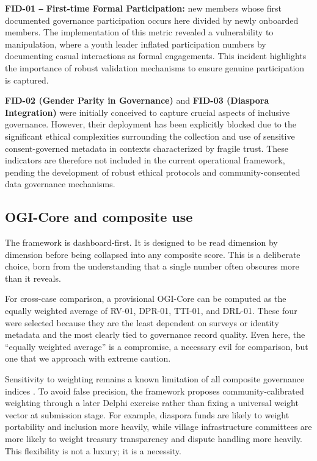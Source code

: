 \documentclass[sigconf,anonymous]{acmart}
\begin{document}
\textbf{FID-01 ‒ First-time Formal Participation:} new members whose first documented governance participation occurs here divided by newly onboarded members. The implementation of this metric revealed a vulnerability to manipulation, where a youth leader inflated participation numbers by documenting casual interactions as formal engagements. This incident highlights the importance of robust validation mechanisms to ensure genuine participation is captured.

\textbf{FID-02 (Gender Parity in Governance)} and \textbf{FID-03 (Diaspora Integration)} were initially conceived to capture crucial aspects of inclusive governance. However, their deployment has been explicitly blocked due to the significant ethical complexities surrounding the collection and use of sensitive consent-governed metadata in contexts characterized by fragile trust. These indicators are therefore not included in the current operational framework, pending the development of robust ethical protocols and community-consented data governance mechanisms.

\subsection{OGI-Core and composite use}

The framework is dashboard-first. It is designed to be read dimension by dimension before being collapsed into any composite score. This is a deliberate choice, born from the understanding that a single number often obscures more than it reveals.

For cross-case comparison, a provisional OGI-Core can be computed as the equally weighted average of RV-01, DPR-01, TTI-01, and DRL-01. These four were selected because they are the least dependent on surveys or identity metadata and the most clearly tied to governance record quality. Even here, the “equally weighted average” is a compromise, a necessary evil for comparison, but one that we approach with extreme caution.

Sensitivity to weighting remains a known limitation of all composite governance indices \cite{langbein2010, oman2010}. To avoid false precision, the framework proposes community-calibrated weighting through a later Delphi exercise rather than fixing a universal weight vector at submission stage. For example, diaspora funds are likely to weight portability and inclusion more heavily, while village infrastructure committees are more likely to weight treasury transparency and dispute handling more heavily. This flexibility is not a luxury; it is a necessity.
\end{document}
